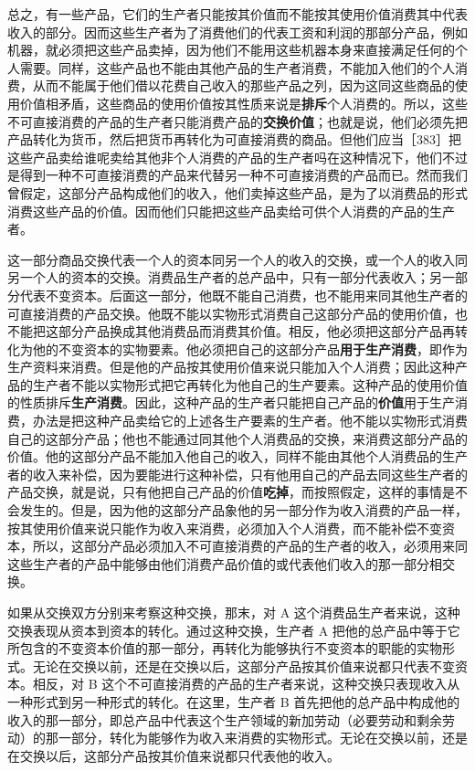 总之，有一些产品，它们的生产者只能按其价值而不能按其使用价值消费其中代表收入的部分。因而这些生产者为了消费他们的代表工资和利润的那部分产品，例如机器，就必须把这些产品卖掉，因为他们不能用这些机器本身来直接满足任何的个人需要。同样，这些产品也不能由其他产品的生产者消费，不能加入他们的个人消费，从而不能属于他们借以花费自己收入的那些产品之列，因为这同这些商品的使用价值相矛盾，这些商品的使用价值按其性质来说是\textbf{排斥}个人消费的。所以，这些不可直接消费的产品的生产者只能消费产品的\textbf{交换价值}；也就是说，他们必须先把产品转化为货币，然后把货币再转化为可直接消费的商品。但他们应当［383］把这些产品卖给谁呢卖给其他非个人消费的产品的生产者吗在这种情况下，他们不过是得到一种不可直接消费的产品来代替另一种不可直接消费的产品而已。然而我们曾假定，这部分产品构成他们的收入，他们卖掉这些产品，是为了以消费品的形式消费这些产品的价值。因而他们只能把这些产品卖给可供个人消费的产品的生产者。

这一部分商品交换代表一个人的资本同另一个人的收入的交换，或一个人的收入同另一个人的资本的交换。消费品生产者的总产品中，只有一部分代表收入；另一部分代表不变资本。后面这一部分，他既不能自己消费，也不能用来同其他生产者的可直接消费的产品交换。他既不能以实物形式消费自己这部分产品的使用价值，也不能把这部分产品换成其他消费品而消费其价值。相反，他必须把这部分产品再转化为他的不变资本的实物要素。他必须把自己的这部分产品\textbf{用于生产消费}，即作为生产资料来消费。但是他的产品按其使用价值来说只能加入个人消费；因此这种产品的生产者不能以实物形式把它再转化为他自己的生产要素。这种产品的使用价值的性质排斥\textbf{生产消费}。因此，这种产品的生产者只能把自己产品的\textbf{价值}用于生产消费，办法是把这种产品卖给它的上述各生产要素的生产者。他不能以实物形式消费自己的这部分产品；他也不能通过同其他个人消费品的交换，来消费这部分产品的价值。他的这部分产品不能加入他自己的收入，同样不能由其他个人消费品的生产者的收入来补偿，因为要能进行这种补偿，只有他用自己的产品去同这些生产者的产品交换，就是说，只有他把自己产品的价值\textbf{吃掉}，而按照假定，这样的事情是不会发生的。但是，因为他的这部分产品象他的另一部分作为收入消费的产品一样，按其使用价值来说只能作为收入来消费，必须加入个人消费，而不能补偿不变资本，所以，这部分产品必须加入不可直接消费的产品的生产者的收入，必须用来同这些生产者的产品中能够由他们消费产品价值的或代表他们收入的那一部分相交换。

如果从交换双方分别来考察这种交换，那末，对 A 这个消费品生产者来说，这种交换表现从资本到资本的转化。通过这种交换，生产者 A 把他的总产品中等于它所包含的不变资本价值的那一部分，再转化为能够执行不变资本的职能的实物形式。无论在交换以前，还是在交换以后，这部分产品按其价值来说都只代表不变资本。相反，对 B 这个不可直接消费的产品的生产者来说，这种交换只表现收入从一种形式到另一种形式的转化。在这里，生产者 B 首先把他的总产品中构成他的收入的那一部分，即总产品中代表这个生产领域的新加劳动（必要劳动和剩余劳动）的那一部分，转化为能够作为收入来消费的实物形式。无论在交换以前，还是在交换以后，这部分产品按其价值来说都只代表他的收入。


